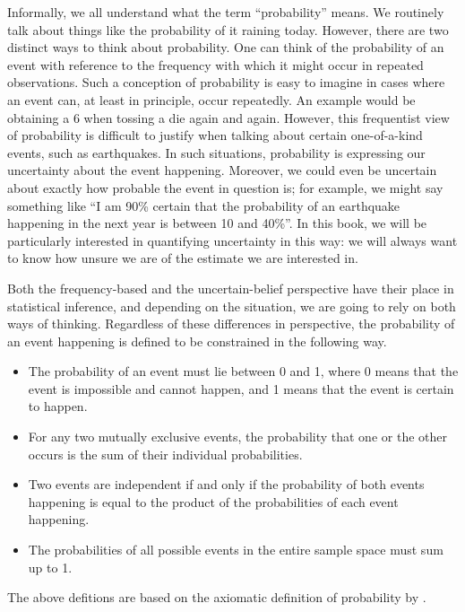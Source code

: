 \documentclass[12pt,]{krantz}
\providecommand{\tightlist}{%
  \setlength{\itemsep}{0pt}\setlength{\parskip}{0pt}}
\theoremstyle{definition}
\theoremstyle{definition}
\theoremstyle{definition}
\theoremstyle{remark}
\begin{document}
Informally, we all understand what the term ``probability'' means. We routinely talk about things like the probability of it raining today. However, there are two distinct ways to think about probability. One can think of the probability of an event with reference to the frequency with which it might occur in repeated observations. Such a conception of probability is easy to imagine in cases where an event can, at least in principle, occur repeatedly. An example would be obtaining a 6 when tossing a die again and again. However, this frequentist view of probability is difficult to justify when talking about certain one-of-a-kind events, such as earthquakes. In such situations, probability is expressing our uncertainty about the event happening. Moreover, we could even be uncertain about exactly how probable the event in question is; for example, we might say something like ``I am 90\% certain that the probability of an earthquake happening in the next year is between 10 and 40\%''. In this book, we will be particularly interested in quantifying uncertainty in this way: we will always want to know how unsure we are of the estimate we are interested in.

Both the frequency-based and the uncertain-belief perspective have their place in statistical inference, and depending on the situation, we are going to rely on both ways of thinking. Regardless of these differences in perspective, the probability of an event happening is defined to be constrained in the following way.

\begin{itemize}
\tightlist
\item
  The probability of an event must lie between 0 and 1, where 0 means that the event is impossible and cannot happen, and 1 means that the event is certain to happen.
\item
  For any two mutually exclusive events, the probability that one or the other occurs is the sum of their individual probabilities.
\item
  Two events are independent if and only if the probability of both events happening is equal to the product of the probabilities of each event happening.
\item
  The probabilities of all possible events in the entire sample space must sum up to 1.
\end{itemize}

The above defitions are based on the axiomatic definition of probability by \citet{kolmogorov2018foundations}.
\end{document}
